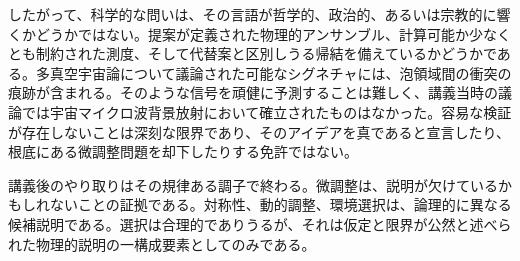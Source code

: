 したがって、科学的な問いは、その言語が哲学的、政治的、あるいは宗教的に響くかどうかではない。提案が定義された物理的アンサンブル、計算可能か少なくとも制約された測度、そして代替案と区別しうる帰結を備えているかどうかである。多真空宇宙論について議論された可能なシグネチャには、泡領域間の衝突の痕跡が含まれる。そのような信号を頑健に予測することは難しく、講義当時の議論では宇宙マイクロ波背景放射において確立されたものはなかった。容易な検証が存在しないことは深刻な限界であり、そのアイデアを真であると宣言したり、根底にある微調整問題を却下したりする免許ではない。

\begin{classroomqa}
\end{classroomqa}

講義後のやり取りはその規律ある調子で終わる。微調整は、説明が欠けているかもしれないことの証拠である。対称性、動的調整、環境選択は、論理的に異なる候補説明である。選択は合理的でありうるが、それは仮定と限界が公然と述べられた物理的説明の一構成要素としてのみである。
